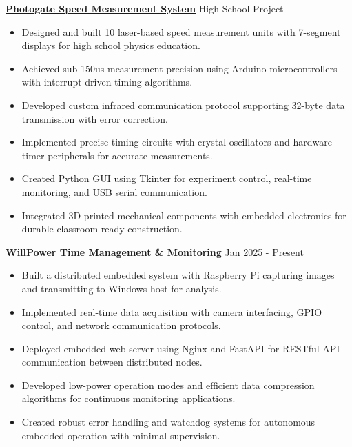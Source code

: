 \documentclass[letterpaper,10pt]{article}
\begin{document}
\vspace{0.2cm}
\noindent\href{https://github.com/Ken-2511/Photogate}{\uline{
\textbf{Photogate Speed Measurement System}}} \hfill High School Project
\begin{itemize}[leftmargin=0.2in]
    \item Designed and built 10 laser-based speed measurement units with 7-segment displays for high school physics education.
    \item Achieved sub-150us measurement precision using Arduino microcontrollers with interrupt-driven timing algorithms.
    \item Developed custom infrared communication protocol supporting 32-byte data transmission with error correction.
    \item Implemented precise timing circuits with crystal oscillators and hardware timer peripherals for accurate measurements.
    \item Created Python GUI using Tkinter for experiment control, real-time monitoring, and USB serial communication.
    \item Integrated 3D printed mechanical components with embedded electronics for durable classroom-ready construction.
\end{itemize}

\vspace{0.2cm}
\noindent\href{https://github.com/Ken-2511/WillPower}{\uline{
\textbf{WillPower \textbar{} Time Management \& Monitoring}}} \hfill Jan 2025 - Present
\begin{itemize}[leftmargin=0.2in]
    \item Built a distributed embedded system with Raspberry Pi capturing images and transmitting to Windows host for analysis.
    \item Implemented real-time data acquisition with camera interfacing, GPIO control, and network communication protocols.
    \item Deployed embedded web server using Nginx and FastAPI for RESTful API communication between distributed nodes.
    \item Developed low-power operation modes and efficient data compression algorithms for continuous monitoring applications.
    \item Created robust error handling and watchdog systems for autonomous embedded operation with minimal supervision.
\end{itemize}
\end{document}
